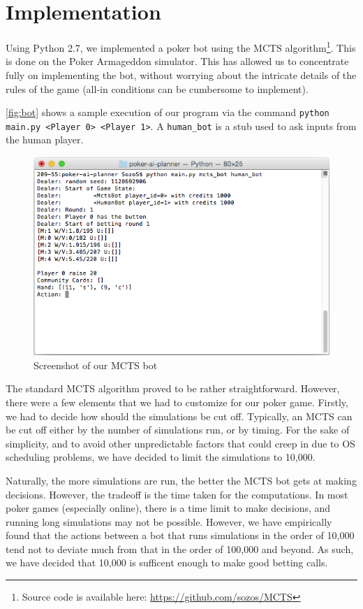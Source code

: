 \documentclass[11pt, a4paper, oneside]{article}
\begin{document}
\section{Implementation}
Using Python 2.7, we implemented a poker bot using the MCTS algorithm\footnote{Source code is available here: \url{https://github.com/sozos/MCTS}}. This is done on the Poker Armageddon simulator. This has allowed us to concentrate fully on implementing the bot, without worrying about the intricate details of the rules of the game (all-in conditions can be cumbersome to implement).

\autoref{fig:bot} shows a sample execution of our program via the command \texttt{python main.py <Player 0> <Player 1>}. A \texttt{human\_bot} is a stub used to ask inputs from the human player.

\begin{figure}[h!]
\centering
\includegraphics[width=\textwidth]{bot.png}
\caption{Screenshot of our MCTS bot}
\label{fig:bot}
\end{figure}

The standard MCTS algorithm proved to be rather straightforward. However, there were a few elements that we had to customize for our poker game. Firstly, we had to decide how should the simulations be cut off. Typically, an MCTS can be cut off either by the number of simulations run, or by timing. For the sake of simplicity, and to avoid other unpredictable factors that could creep in due to OS scheduling problems, we have decided to limit the simulations to 10,000.

Naturally, the more simulations are run, the better the MCTS bot gets at making decisions. However, the tradeoff is the time taken for the computations. In most poker games (especially online), there is a time limit to make decisions, and running long simulations may not be possible. However, we have empirically found that the actions between a bot that runs simulations in the order of 10,000 tend not to deviate much from that in the order of 100,000 and beyond. As such, we have decided that 10,000 is sufficent enough to make good betting calls.
\end{document}
